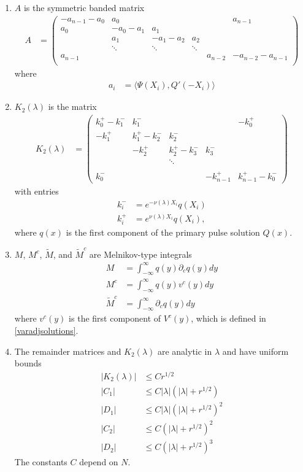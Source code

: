 \documentclass[thesis.tex]{subfiles}
\begin{document}
\begin{theorem}
\begin{enumerate}
\item $A$ is the symmetric banded matrix
\begin{align}\label{Asymm}
A &= \begin{pmatrix}
-a_{n-1} - a_0 & a_0 & & &  & a_{n-1}\\
a_0 & -a_0 - a_1 &  a_1 \\
& a_1 & -a_1 - a_2 &  a_2 \\
& \ddots & \ddots & \ddots \\
a_{n-1} & & & & a_{n-2} & -a_{n-2} - a_{n-1} \\
\end{pmatrix}
\end{align}
where
\begin{align*}
a_i &= \langle \Psi(X_i), Q'(-X_i) \rangle
\end{align*}

\item $K_2(\lambda)$ is the matrix
\begin{align*}
K_2(\lambda) &= \begin{pmatrix}
k_0^+ - k_1^- & k_1^- &&& -k_0^+ \\
-k_1^+ & k_1^+ - k_2^- & k_2^- \\
& -k_2^+ & k_2^+ - k_3^- & k_3^- \\ && \ddots \\
\\
k_0^- &&& -k_{n-1}^+ & k_{n-1}^+ - k_0^- 
\end{pmatrix}
\end{align*}
with entries
\begin{align*}
k_i^- &= e^{-\nu(\lambda)X_i} q(X_i)\\
k_i^+ &= e^{\nu(\lambda)X_i} q(X_i),
\end{align*}
where $q(x)$ is the first component of the primary pulse solution $Q(x)$. 

\item $M$, $M^c$, $\tilde{M}$, and $\tilde{M}^c$ are  Melnikov-type integrals
\begin{align*}
M &= \int_{-\infty}^\infty q(y) \partial_c q(y) dy \\
M^c &= \int_{-\infty}^\infty q(y) v^c(y) dy \\
\tilde{M}^c &= \int_{-\infty}^\infty \partial_c q(y) dy
\end{align*}
where $v^c(y)$ is the first component of $V^c(y)$, which is defined in \cref{varadjsolutions}.

\item The remainder matrices and $K_2(\lambda)$ are analytic in $\lambda$ and have uniform bounds
\begin{align*}
|K_2(\lambda)| &\leq C r^{1/2} \\
|C_1| &\leq C |\lambda|(|\lambda| + r^{1/2}) \\
|D_1| &\leq C |\lambda|(|\lambda| + r^{1/2})^2 \\
|C_2| &\leq C (|\lambda| + r^{1/2})^2 \\
|D_2| &\leq C (|\lambda| + r^{1/2})^3 
\end{align*}
The constants $C$ depend on $N$.
\end{enumerate}
\end{theorem}
\end{document}
